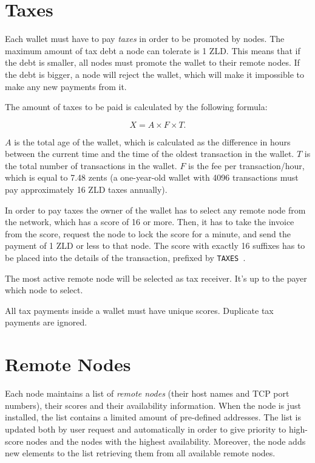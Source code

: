 \documentclass[11pt,oneside]{article}
\newcommand\dd[1]{\colorbox{gray!30}{\texttt{#1}}}
\begin{document}
\section{Taxes}

Each wallet must have to pay \emph{taxes} in order to be promoted by nodes.
The maximum amount of tax debt a node can tolerate is 1 ZLD. This means
that if the debt is smaller, all nodes must promote the wallet to their
remote nodes. If the debt is bigger, a node will reject the wallet,
which will make it impossible to make any new payments from it.

The amount of taxes to be paid is calculated by the following formula:

$$X = A \times F \times T.$$

$A$ is the total age of the wallet,
which is calculated as the difference in hours between the current time
and the time of the oldest transaction in the wallet.
$T$ is the total number of transactions in the wallet.
$F$ is the fee per transaction/hour, which is equal to 7.48 zents
(a one-year-old wallet with 4096 transactions must pay approximately 16 ZLD taxes annually).

In order to pay taxes the owner of the wallet has to select any remote
node from the network, which has a score of 16 or more. Then, it has to
take the invoice from the score, request the node to lock the score
for a minute, and send the payment of 1 ZLD or less
to that node. The score with exactly 16 suffixes
has to be placed into the details of the transaction,
prefixed by \dd{TAXES }.

The most active remote node will be selected as tax receiver.
It's up to the payer which node to select.

All tax payments inside a wallet must have unique scores.
Duplicate tax payments are ignored.

\section{Remote Nodes}

Each node maintains a list of \emph{remote nodes} (their host names and TCP port numbers),
their scores and their availability information. When the node is just installed,
the list contains a limited amount of pre-defined addresses. The list is
updated both by user request and automatically in order to give priority
to high-score nodes and the nodes with the highest availability.
Moreover, the node adds new elements to the list retrieving them from all
available remote nodes.
\end{document}
